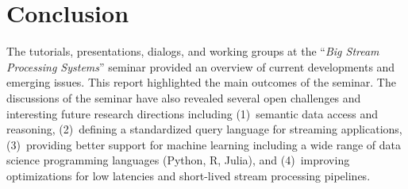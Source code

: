 \section{Conclusion}\label{sec:conclusion}

The tutorials, presentations, dialogs, and working groups at the
``\emph{Big Stream Processing Systems}'' seminar provided an overview
of current developments and emerging issues.  This report highlighted
the main outcomes of the seminar. The discussions of the seminar have
also revealed several open challenges and interesting future research
directions including (1)~semantic data access and reasoning,
(2)~defining a standardized query language for streaming applications,
(3)~providing better support for machine learning including a wide
range of data science programming languages (Python, R, Julia), and
(4)~improving optimizations for low latencies and short-lived stream
processing pipelines.
